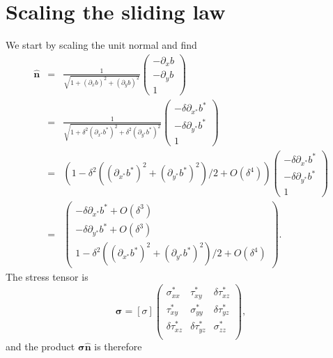 \documentclass[10pt,a4paper]{book}
\newcommand{\p}{\partial}
\newcommand{\de}{\delta}
\newcommand{\txy}{\tau_{xy}}
\newcommand{\txz}{\tau_{xz}}
\newcommand{\tyz}{\tau_{yz}}
\newcommand{\sxx}{\sigma_{xx}}
\newcommand{\syy}{\sigma_{yy}}
\newcommand{\szz}{\sigma_{zz}}
\newcommand{\normal}{\hat{\bm{n}}}
\begin{document}

\section{Scaling the sliding law}
We start by scaling the unit normal and find
\begin{eqnarray}
 \hat{\bm{n}}&=&\frac{1}{\sqrt{1+( \p_x b)^2 + (\p_y b)^2}}
 \left ( \begin{array}{c} -\p_x b  \\ -\p_y b \\ 1 \end{array} \right )\nonumber \\
    &=&\frac{1}{\sqrt{1+\de^2 ( \p_{x^*} b^*)^2 + \de^2 (\p_{y^*} b^*)^2}}
 \left ( \begin{array}{c} -\de \p_{x^*} b^* \\ -\de \p_{y^*} b^* \\ 1 \end{array} \right )\nonumber \\
    &=& \left (1-\de^2 ((\p_{x^*} b^*)^2+(\p_{y^*} b^*)^2)/2+O(\de^4) \right )
 \left ( \begin{array}{c} -\de \p_{x^*} b^* \\ -\de \p_{y^*} b^* \\ 1 \end{array} \right )\nonumber \\
    &=&   \left ( \begin{array}{c} -\de \p_{x^*} b^* +O(\de^3) \\ 
          -\de \p_{y^*} b^* +O(\de^3) \\ 
         1 -\de^2 ((\p_{x^*} b^*)^2+(\p_{y^*} b^*)^2)/2 +O(\de^4)
 \end{array} \right ). \label{eq:n}
 \end{eqnarray}
\setlength{\arraycolsep}{0pt}
The stress tensor is 
 \[
 \bm{\sigma}= [\sigma] \left ( \begin{array}{ccc} 
 \sxx^* & \txy^* & \de \txz^* \\
 \txy^* & \syy^* & \de \tyz^* \\
 \de \txz^* & \de \tyz^* & \szz^* \\
 \end{array} \right ),
 \]
and the product $\bm{\sigma} \normal$ is therefore
\end{document}
